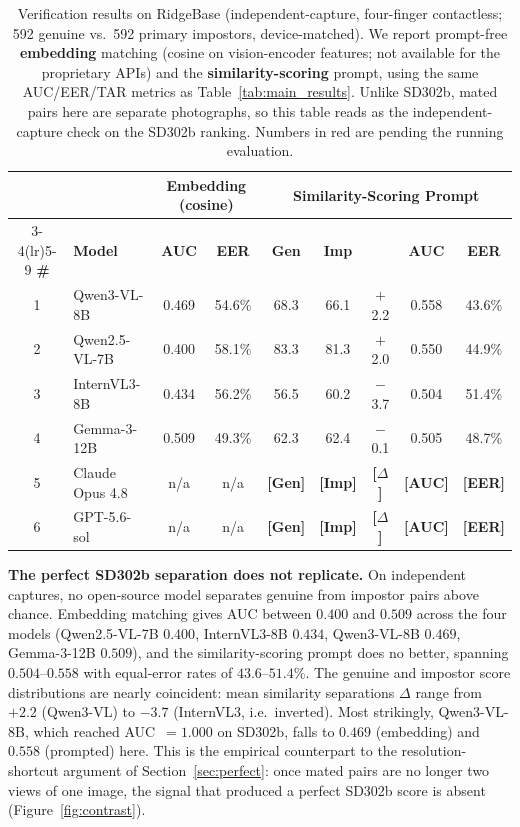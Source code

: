 \documentclass[journal]{IEEEtran}
\newcommand{\ph}[1]{{\color{red}\textbf{[#1]}}}
\begin{document}
\begin{table}[t]
\centering
\caption{Verification results on RidgeBase (independent-capture, four-finger
  contactless; 592 genuine vs.\ 592 primary impostors, device-matched). We
  report prompt-free \textbf{embedding} matching (cosine on vision-encoder
  features; not available for the proprietary APIs) and the
  \textbf{similarity-scoring} prompt, using the same AUC/EER/TAR metrics as
  Table~\ref{tab:main_results}. Unlike SD302b, mated pairs here are separate
  photographs, so this table reads as the independent-capture check on the
  SD302b ranking. Numbers in red are pending the running evaluation.}
\label{tab:ridgebase_main}
\renewcommand{\arraystretch}{1.25}
\setlength{\tabcolsep}{5pt}
\footnotesize
\begin{tabular}{c l cc ccccc}
\toprule
& & \multicolumn{2}{c}{\cellcolor{grpScore}\textbf{Embedding (cosine)}}
  & \multicolumn{5}{c}{\cellcolor{grpBin}\textbf{Similarity-Scoring Prompt}} \\
\cmidrule(lr){3-4}\cmidrule(lr){5-9}
\textbf{\#} & \textbf{Model}
  & \textbf{AUC} & \textbf{EER}
  & \textbf{Gen} & \textbf{Imp} & \boldmath{$\Delta$} & \textbf{AUC} & \textbf{EER} \\
\midrule
1 & Qwen3-VL-8B     & 0.469 & 54.6\% & 68.3 & 66.1 & $+$2.2 & 0.558 & 43.6\% \\
2 & Qwen2.5-VL-7B   & 0.400 & 58.1\% & 83.3 & 81.3 & $+$2.0 & 0.550 & 44.9\% \\
3 & InternVL3-8B    & 0.434 & 56.2\% & 56.5 & 60.2 & $-$3.7 & 0.504 & 51.4\% \\
4 & Gemma-3-12B     & 0.509 & 49.3\% & 62.3 & 62.4 & $-$0.1 & 0.505 & 48.7\% \\
\midrule
5 & Claude Opus 4.8 & n/a   & n/a    & \ph{Gen} & \ph{Imp} & \ph{$\Delta$} & \ph{AUC} & \ph{EER} \\
6 & GPT-5.6-sol     & n/a   & n/a    & \ph{Gen} & \ph{Imp} & \ph{$\Delta$} & \ph{AUC} & \ph{EER} \\
\bottomrule
\end{tabular}
\end{table}

\textbf{The perfect SD302b separation does not replicate.} On independent
captures, no open-source model separates genuine from impostor pairs above
chance. Embedding matching gives AUC between $0.400$ and $0.509$ across the
four models (Qwen2.5-VL-7B $0.400$, InternVL3-8B $0.434$, Qwen3-VL-8B $0.469$,
Gemma-3-12B $0.509$), and the similarity-scoring prompt does no better,
spanning $0.504$--$0.558$ with equal-error rates of $43.6$--$51.4\%$. The
genuine and impostor score distributions are nearly coincident: mean
similarity separations $\Delta$ range from $+2.2$ (Qwen3-VL) to $-3.7$
(InternVL3, i.e.\ inverted). Most strikingly, Qwen3-VL-8B, which reached
AUC~$= 1.000$ on SD302b, falls to $0.469$ (embedding) and $0.558$ (prompted)
here. This is the empirical counterpart to the resolution-shortcut argument of
Section~\ref{sec:perfect}: once mated pairs are no longer two views of one
image, the signal that produced a perfect SD302b score is absent
(Figure~\ref{fig:contrast}).
\end{document}
